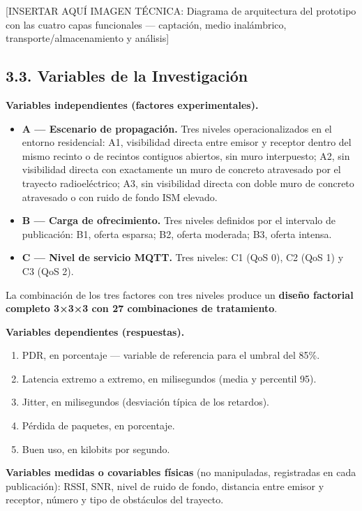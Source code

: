 \documentclass[
  12pt,
]{article}
\providecommand{\tightlist}{%
  \setlength{\itemsep}{0pt}\setlength{\parskip}{0pt}}
\begin{document}
{[}INSERTAR AQUÍ IMAGEN TÉCNICA: Diagrama de arquitectura del prototipo
con las cuatro capas funcionales — captación, medio inalámbrico,
transporte/almacenamiento y análisis{]}

\subsection{3.3. Variables de la
Investigación}\label{variables-de-la-investigaciuxf3n}

\textbf{Variables independientes (factores experimentales).}

\begin{itemize}
\tightlist
\item
  \textbf{A — Escenario de propagación.} Tres niveles operacionalizados
  en el entorno residencial: A1, visibilidad directa entre emisor y
  receptor dentro del mismo recinto o de recintos contiguos abiertos,
  sin muro interpuesto; A2, sin visibilidad directa con exactamente un
  muro de concreto atravesado por el trayecto radioeléctrico; A3, sin
  visibilidad directa con doble muro de concreto atravesado o con ruido
  de fondo ISM elevado.
\item
  \textbf{B — Carga de ofrecimiento.} Tres niveles definidos por el
  intervalo de publicación: B1, oferta esparsa; B2, oferta moderada; B3,
  oferta intensa.
\item
  \textbf{C — Nivel de servicio MQTT.} Tres niveles: C1 (QoS 0), C2 (QoS
  1) y C3 (QoS 2).
\end{itemize}

La combinación de los tres factores con tres niveles produce un
\textbf{diseño factorial completo 3×3×3 con 27 combinaciones de
tratamiento}.

\textbf{Variables dependientes (respuestas).}

\begin{enumerate}
\def\labelenumi{\arabic{enumi}.}
\tightlist
\item
  PDR, en porcentaje — variable de referencia para el umbral del 85\%.
\item
  Latencia extremo a extremo, en milisegundos (media y percentil 95).
\item
  Jitter, en milisegundos (desviación típica de los retardos).
\item
  Pérdida de paquetes, en porcentaje.
\item
  Buen uso, en kilobits por segundo.
\end{enumerate}

\textbf{Variables medidas o covariables físicas} (no manipuladas,
registradas en cada publicación): RSSI, SNR, nivel de ruido de fondo,
distancia entre emisor y receptor, número y tipo de obstáculos del
trayecto.
\end{document}
